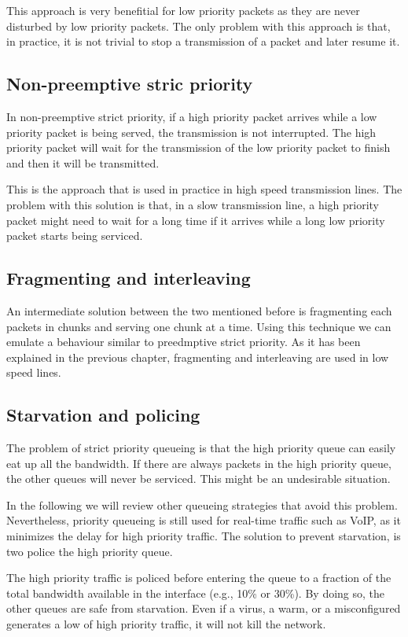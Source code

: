 This approach is very benefitial for low priority packets as they are never disturbed by low priority packets.
The only problem with this approach is that, in practice, it is not trivial to stop a transmission of a packet and later resume it.

\subsection{Non-preemptive stric priority}
In non-preemptive strict priority, if a high priority packet arrives while a low priority packet is being served, the transmission is not interrupted.
The high priority packet will wait for the transmission of the low priority packet to finish and then it will be transmitted.

This is the approach that is used in practice in high speed transmission lines.
The problem with this solution is that, in a slow transmission line, a high priority packet might need to wait for a long time if it arrives while a long low priority packet starts being serviced.

\subsection{Fragmenting and interleaving}
An intermediate solution between the two mentioned before is fragmenting each packets in chunks and serving one chunk at a time. 
Using this technique we can emulate a behaviour similar to preedmptive strict priority.
As it has been explained in the previous chapter, fragmenting and interleaving are used in low speed lines.

\subsection{Starvation and policing}
The problem of strict priority queueing is that the high priority queue can easily eat up all the bandwidth.
If there are always packets in the high priority queue, the other queues will never be serviced.
This might be an undesirable situation.

In the following we will review other queueing strategies that avoid this problem.
Nevertheless, priority queueing is still used for real-time traffic such as VoIP, as it minimizes the delay for high priority traffic.
The solution to prevent starvation, is two police the high priority queue.

The high priority traffic is policed before entering the queue to a fraction of the total bandwidth available in the interface (e.g., 10\% or 30\%).
By doing so, the other queues are safe from starvation.
Even if a virus, a warm, or a misconfigured generates a low of high priority traffic, it will not kill the network.

